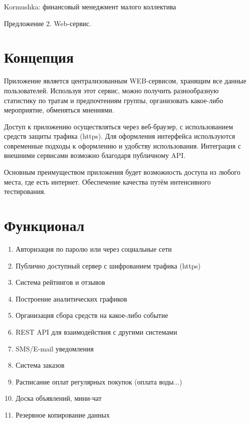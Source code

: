 \documentclass[a4paper,12pt]{article} %
\begin{document}
\thispagestyle{empty}%

\begin{flushright}

Kormushka: финансовый менеджмент малого коллектива

Предложение 2. Web-сервис.

\hrulefill
\end{flushright}

\section*{Концепция}

Приложение является централизованным WEB-сервисом, хранящим все данные пользователей. Используя этот сервис, можно получить разнообразную статистику по тратам и предпочтениям группы, организовать какое-либо мероприятие, обменяться мнениями.

Доступ к приложению осуществляться через веб-браузер, с использованием средств защиты трафика (https). Для оформления интерфейса используются современные подходы к оформлению и удобству использования. Интеграция с внешними сервисами возможно благодаря публичному API.

Основным преимуществом приложения будет возможность доступа из любого места, где есть интернет. Обеспечение качества путём интенсивного тестирования.

\section*{Функционал}

\begin{enumerate}

\item Авторизация по паролю или через социальные сети
\item Публично доступный сервер с шифрованием трафика (https)
\item Система рейтингов и отзывов
\item Построение аналитических графиков
\item Организация сбора средств на какое-либо событие
\item REST API для взаимодействия с другими системами
\item SMS/E-mail уведомления
\item Система заказов
\item Расписание оплат регулярных покупок (оплата воды...)
\item Доска объявлений, мини-чат
\item Резервное копирование данных

\end{enumerate}
\end{document}
